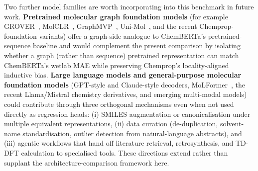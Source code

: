\documentclass[journal=jcisd8,manuscript=article]{achemso}
\begin{document}
Two further model families are worth incorporating into this benchmark in future work. \textbf{Pretrained molecular graph foundation models} (for example GROVER~\cite{rong2020grover}, MolCLR~\cite{wang2022molecular}, GraphMVP~\cite{liu2021pretraining}, Uni-Mol~\cite{zhou2023unimol}, and the recent Chemprop-foundation variants) offer a graph-side analogue to ChemBERTa's pretrained-sequence baseline and would complement the present comparison by isolating whether a graph (rather than sequence) pretrained representation can match ChemBERTa's wetlab MAE while preserving Chemprop's locality-aligned inductive bias. \textbf{Large language models and general-purpose molecular foundation models} (GPT-style and Claude-style decoders, MoLFormer~\cite{ross2022molformer}, the recent Llama/Mistral chemistry derivatives, and emerging multi-modal models) could contribute through three orthogonal mechanisms even when not used directly as regression heads: (i) SMILES augmentation or canonicalisation under multiple equivalent representations, (ii) data curation (de-duplication, solvent-name standardisation, outlier detection from natural-language abstracts), and (iii) agentic workflows that hand off literature retrieval, retrosynthesis, and TD-DFT calculation to specialised tools. These directions extend rather than supplant the architecture-comparison framework here.


\end{document}
